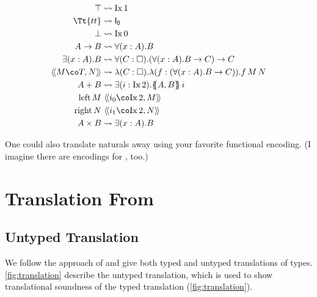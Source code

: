 \documentclass[authoryear,acmsmall,screen]{acmart}
\newcommand\FZero{\mathsf{I_0}}
\newcommand\Ix[1]{\mathrm{Ix} \, #1}
\renewcommand\tt{\Tt{tt}}
\newcommand\TyPair[3]{\ensuremath{\langle\!\langle #1 \co #2 , #3 \rangle\!\rangle}}
\renewcommand\left{\mathrm{left}}
\renewcommand\right{\mathrm{right}}
\newcommand\Felim[1]{\{\!\!\{#1\}\!\!\}}
\begin{document}
\begin{align*}
  \top &\leadsto \Ix 1 \\
  \tt &\leadsto  \FZero \\
  \bot &\leadsto \Ix 0 \\
  A \to B &\leadsto \forall (x : A). B \\
  \exists(x : A). B &\leadsto \forall (C : \Box).(\forall (x : A). B \to C) \to C \\
  \TyPair M T N &\leadsto \lambda (C : \Box). \lambda (f : (\forall (x : A). B \to C)). f \, M \, N \\
  A + B &\leadsto \exists (i : \Ix 2). \Felim {A,B} \, i \\
  \left\, M &\ \TyPair {i_0} {\Ix 2} {M} \\
  \right\, N &\ \TyPair {i_1} {\Ix 2} {N} \\
  A \times B &\leadsto \exists (x : A). B
\end{align*}

One could also translate naturals away using your favorite functional encoding. (I imagine there are encodings for , too.)

\section{Translation From \RO}

\subsection{Untyped Translation}

We follow the approach of \cite{MorrisM19} and give both typed and untyped translations of \RO types. \cref{fig:translation} describe the untyped translation, which is used to show translational soundness of the typed translation (\cref{fig:translation}).
\end{document}
